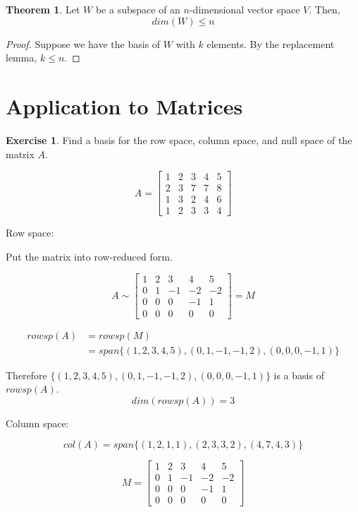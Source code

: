 \documentclass{report}
\theoremstyle{definition}
\newtheorem{_exc}{Exercise}[section]
\newtheorem{_thm}{Theorem}[section]
\theoremstyle{remark}
\begin{document}
\begin{_thm}
Let $W$ be a subspace of an $n$-dimensional vector space $V$.
Then,
\[dim(W)\leq n\]
\end{_thm}

\begin{proof}
Suppose we have the basis of $W$ with $k$ elements.
By the replacement lemma, $k\leq n$.
\end{proof}

\section{Application to Matrices}

\begin{_exc}
Find a basis for the row space, column space, and null space of the matrix $A$.

\[A=\begin{bmatrix}
1 & 2 & 3 & 4 & 5 \\
2 & 3 & 7 & 7 & 8 \\
1 & 3 & 2 & 4 & 6 \\
1 & 2 & 3 & 3 & 4
\end{bmatrix}\]

Row space:

Put the matrix into row-reduced form.

\[A\sim\begin{bmatrix}
1 & 2 & 3 & 4 & 5 \\
0 & 1 & -1 & -2 & -2 \\
0 & 0 & 0 & -1 & 1 \\
0 & 0 & 0 & 0 & 0
\end{bmatrix}=M\]

\begin{align*}
rowsp(A)&=rowsp(M) \\
&=span\{(1,2,3,4,5),(0,1,-1,-1,2),(0,0,0,-1,1)\}
\end{align*}

Therefore $\{(1,2,3,4,5),(0,1,-1,-1,2),(0,0,0,-1,1)\}$ is a basis of $rowsp(A)$.
\[dim(rowsp(A))=3\]

Column space:

\[col(A)=span\{(1,2,1,1),(2,3,3,2),(4,7,4,3)\}\]

\[M=\begin{bmatrix}
\boxed{1} & 2 & 3 & 4 & 5 \\
0 & \boxed{1} & -1 & -2 & -2 \\
0 & 0 & 0 & \boxed{-1} & 1 \\
0 & 0 & 0 & 0 & 0
\end{bmatrix}\]


\end{_exc}
\end{document}

